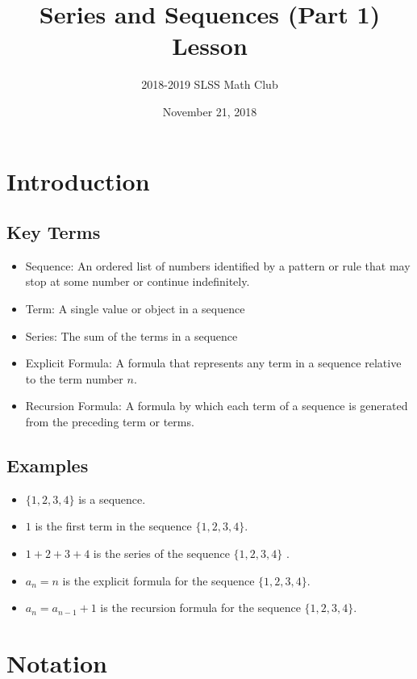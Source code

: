 \documentclass[12pt]{article}
\title{Series and Sequences (Part 1) Lesson\vspace{-3mm}}
\author{2018-2019 SLSS Math Club\vspace{-5mm}}
\date{November 21, 2018\vspace{-5mm}}
\begin{document}
\maketitle

\section{Introduction}
\subsection{Key Terms}
\begin{itemize}
    \item Sequence: An ordered list of numbers identified by a pattern or rule that may stop at some number or continue indefinitely.
    \item Term: A single value or object in a sequence
    \item Series: The sum of the terms in a sequence
    \item Explicit Formula: A formula that represents any term in a sequence relative to the term number $n$.
    \item Recursion Formula: A formula by which each term of a sequence is generated from the preceding term or terms.
\end{itemize}

\subsection{Examples}
\begin{itemize}
    \item $\{1, 2, 3, 4\}$ is a sequence.
    \item $1$ is the first term in the sequence $\{1, 2, 3, 4\}$.
    \item $1 + 2 + 3 + 4$ is the series of the sequence $\{1, 2, 3, 4\}$ .
    \item $a_n = n$ is the explicit formula for the sequence $\{1, 2, 3, 4\}$.
    \item $a_n = a_{n-1} + 1$ is the recursion formula for the sequence $\{1, 2, 3, 4\}$.
\end{itemize}

\section{Notation}
\end{document}
